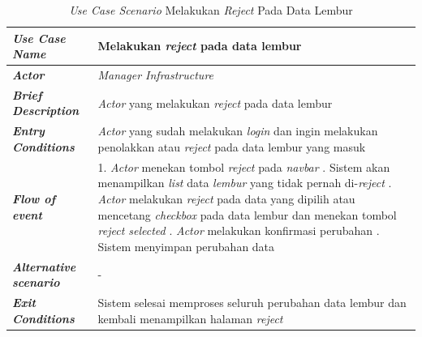 \FloatBarrier
\begin{longtable}{ |p{6cm}|p{8cm}|}
\caption{\textit{Use Case Scenario} Melakukan \textit{Reject} Pada Data Lembur}\label{tab:use-case-scenario-melakukan-approval} 
\\
\hline
\textbf{\textit{Use Case Name}}
&Melakukan \textit{reject} pada data lembur
\\ \hline

\textbf{\textit{Actor}}
&\textit{Manager Infrastructure}
\\ \hline

\textbf{\textit{Brief Description}}
&\textit{Actor} yang melakukan \textit{reject} pada data lembur
\\ \hline

\textbf{\textit{Entry Conditions}}
&\textit{Actor} yang sudah melakukan \textit{login} dan ingin melakukan penolakkan atau \textit{reject} pada data lembur yang masuk
\\ \hline

\textbf{\textit{Flow of event}}
&1. \textit{Actor} menekan tombol \textit{reject} pada \textit{navbar}
\newline
2. Sistem akan menampilkan \textit{list} data \textit{lembur} yang tidak pernah di-\textit{reject}
\newline
3. \textit{Actor} melakukan \textit{reject} pada data yang dipilih atau mencetang \textit{checkbox} pada data lembur dan menekan tombol \textit{reject selected}
\newline
5. \textit{Actor} melakukan konfirmasi perubahan
\newline
6. Sistem menyimpan perubahan data
\\ \hline

\textbf{\textit{Alternative scenario}}
&-
\\ \hline

\textbf{\textit{Exit Conditions}}
&Sistem selesai memproses seluruh perubahan data lembur dan kembali menampilkan halaman \textit{reject}
\\ \hline
\end{longtable}

